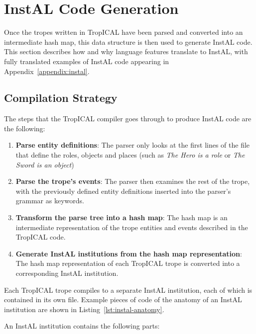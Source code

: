\documentclass[11pt]{report}
\begin{document}
\section{InstAL Code Generation}
\label{sec:t-codegen}
Once the tropes written in TropICAL have been parsed and converted into an
intermediate hash map, this data structure is then used to generate InstAL code.
This section describes how and why language features translate to
InstAL, with fully translated examples of InstAL code appearing in Appendix~\ref{appendix:instal}.

\subsection{Compilation Strategy}

The steps that the TropICAL compiler goes through to produce InstAL code are the
following:

\begin{enumerate}
\item \textbf{Parse entity definitions}: The parser only looks at the first
  lines of the file that define the roles, objects and places (such as \emph{The
    Hero is a role} or \emph{The Sword is an object})
\item \textbf{Parse the trope's events}: The parser then examines the rest of
  the trope, with the previously defined entity definitions inserted into the
  parser's grammar as keywords.
\item \textbf{Transform the parse tree into a hash map}: The hash map is an
  intermediate representation of the trope entities and events described in the
  TropICAL code.
\item \textbf{Generate InstAL institutions from the hash map representation}:
  The hash map representation of each TropICAL trope is converted into a corresponding InstAL institution.
\end{enumerate}

Each TropICAL trope compiles to a separate InstAL institution, each of which is
contained in its own file. Example pieces of code of the anatomy of an InstAL institution are
shown in Listing~\ref{lst:instal-anatomy}. 

An InstAL institution contains the following parts:
\end{document}
